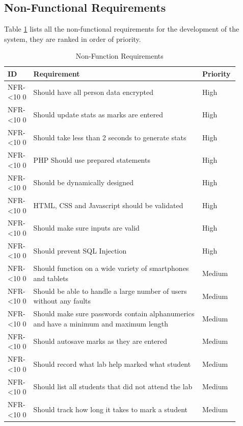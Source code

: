 \documentclass[12pt]{article}  %
\newcommand{\rid}[1]{\centering #1-\ifnum\value{requirement}<10 0\fi\arabic{requirement} \stepcounter{requirement}}
\begin{document}
\newpage
\subsection{Non-Functional Requirements}

Table \ref{table:non-func} lists all the non-functional requirements for the development of the system, they are ranked in order of priority.

\begin{spacing}{1.5}
\begin{longtable}{|p{0.1\linewidth}|p{0.7\linewidth}|p{0.1\linewidth}|}
\caption{Non-Function Requirements} \label{table:non-func}\\
\hline
\textbf{ID} & \textbf{Requirement} & \textbf{Priority}\\
\hline \hline

\rid{NFR} & Should have all person data encrypted & High\\ \hline
\rid{NFR} & Should update stats as marks are entered & High\\ \hline
\rid{NFR} & Should take less than 2 seconds to generate stats  & High\\ \hline
\rid{NFR} & PHP Should use prepared statements & High\\ \hline
\rid{NFR} & Should be dynamically designed & High\\ \hline
\rid{NFR} & HTML, CSS and Javascript should be validated & High\\ \hline
\rid{NFR} & Should make sure inputs are valid & High\\ \hline
\rid{NFR} & Should prevent SQL Injection & High\\ \hline

\rid{NFR} & Should function on a wide variety of smartphones and tablets & Medium\\ \hline
\rid{NFR} & Should be able to handle a large number of users without any faults & Medium\\ \hline
\rid{NFR} & Should make sure passwords contain alphanumerics and have a minimum and maximum length  & Medium\\ \hline
\rid{NFR} & Should autosave marks as they are entered & Medium\\ \hline
\rid{NFR} & Should record what lab help marked what student & Medium\\ \hline
\rid{NFR} & Should list all students that did not attend the lab & Medium\\ \hline
\rid{NFR} & Should track how long it takes to mark a student & Medium \\ \hline


\end{longtable}
\end{spacing}
\end{document}
